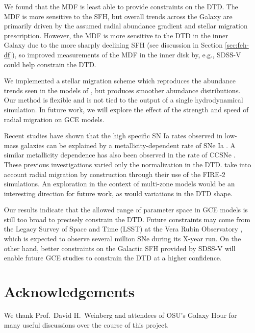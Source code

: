 \documentclass[twocolumn,twocolappendix,linenumbers]{aastex631}
\begin{document}
We found that the MDF is least able to provide constraints on the DTD. The MDF is more sensitive to the SFH, but overall trends across the Galaxy are primarily driven by the assumed radial abundance gradient and stellar migration prescription. However, the MDF is more sensitive to the DTD in the inner Galaxy due to the more sharply declining SFH (see discussion in Section \ref{sec:feh-df}), so improved measurements of the MDF in the inner disk by, e.g., SDSS-V \citep{Kollmeier2017-SDSS-V} could help constrain the DTD.

We implemented a stellar migration scheme which reproduces the abundance trends seen in the models of , but produces smoother abundance distributions. Our method is flexible and is not tied to the output of a single hydrodynamical simulation. In future work, we will explore the effect of the strength and speed of radial migration on GCE models.

Recent studies have shown that the high specific SN Ia rates observed in low-mass galaxies \citep[e.g.,][]{Brown2019-ASASSNrates,Wiseman2021-DESRates} can be explained by a metallicity-dependent rate of SNe Ia \citep{Gandhi2022-MetallicityDependentRates,Johnson2023-Binaries}. A similar metallicity dependence has also been observed in the rate of CCSNe \citep{Pessi2023-MetalDepCCSNe}. These previous investigations varied only the normalization in the DTD. \citet{Gandhi2022-MetallicityDependentRates} take into account radial migration by construction through their use of the FIRE-2 simulations. An exploration in the context of multi-zone models would be an interesting direction for future work, as would variations in the DTD shape.

Our results indicate that the allowed range of parameter space in GCE models is still too broad to precisely constrain the DTD. Future constraints may come from the Legacy Survey of Space and Time (LSST) at the Vera Rubin Observatory \citep{Ivezic2019-LSST}, which is expected to observe several million SNe during its X-year run. On the other hand, better constraints on the Galactic SFH provided by SDSS-V \citep{Kollmeier2017-SDSS-V} will enable future GCE studies to constrain the DTD at a higher confidence.

\section*{Acknowledgements}

We thank Prof.\ David H.\ Weinberg and attendees of OSU's Galaxy Hour for many useful discussions over the course of this project.
\end{document}
